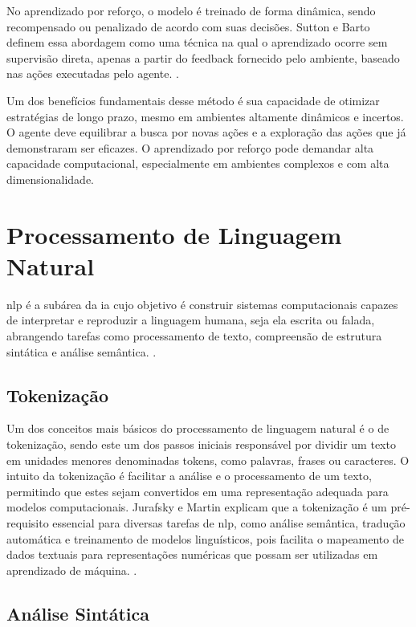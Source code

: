 No aprendizado por reforço, o modelo é treinado de forma dinâmica, sendo recompensado ou penalizado de acordo com suas decisões. Sutton e Barto definem essa abordagem como uma técnica na qual o aprendizado ocorre sem supervisão direta, apenas a partir do feedback fornecido pelo ambiente, baseado nas ações executadas pelo agente. \cite{SuttonBarto2018}.

Um dos benefícios fundamentais desse método é sua capacidade de otimizar estratégias de longo prazo, mesmo em ambientes altamente dinâmicos e incertos. O agente deve equilibrar a busca por novas ações e a exploração das ações que já demonstraram ser eficazes. O aprendizado por reforço pode demandar alta capacidade computacional, especialmente em ambientes complexos e com alta dimensionalidade. \cite{SuttonBarto2018}

\section{Processamento de Linguagem Natural}\label{subsec:nlp}

\gls{nlp} é a subárea da \gls{ia} cujo objetivo é construir sistemas computacionais capazes de interpretar e reproduzir a linguagem humana, seja ela escrita ou falada, abrangendo tarefas como processamento de texto, compreensão de estrutura sintática e análise semântica. \cite{JurafskyMartin2023}.

\subsection{Tokenização}\label{subsec:nlp1}

Um dos conceitos mais básicos do processamento de linguagem natural é o de tokenização, sendo este um dos passos iniciais responsável por dividir um texto em unidades menores denominadas tokens, como palavras, frases ou caracteres. O intuito da tokenização é facilitar a análise e o processamento de um texto, permitindo que estes sejam convertidos em uma representação adequada para modelos computacionais. Jurafsky e Martin explicam que a tokenização é um pré-requisito essencial para diversas tarefas de \gls{nlp}, como análise semântica, tradução automática e treinamento de modelos linguísticos, pois facilita o mapeamento de dados textuais para representações numéricas que possam ser utilizadas em aprendizado de máquina. \cite{JurafskyMartin2023}.

\subsection{Análise Sintática}\label{subsec:nlp2}

